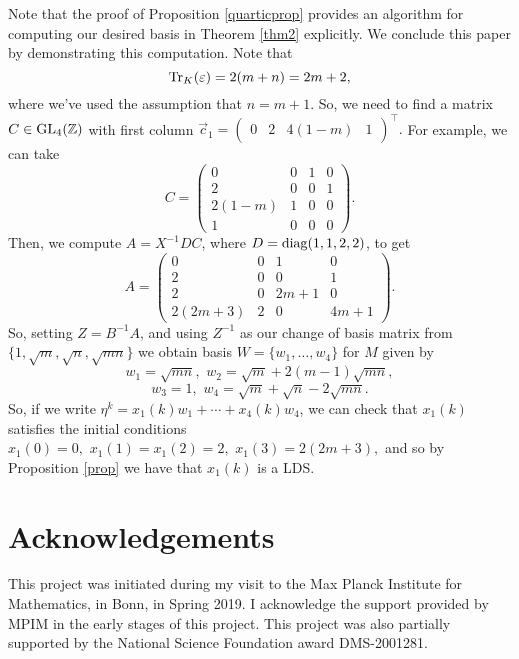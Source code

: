 \documentclass[11pt]{amsart}
\begin{document}
\begin{rmk} Note that the proof of Proposition \ref{quarticprop} provides an algorithm for computing our desired basis in Theorem \ref{thm2} explicitly. We conclude this paper by demonstrating this computation. Note that \[\operatorname{Tr}_K(\varepsilon)=2(m+n)=2m+2,\] where we've used the assumption that $n=m+1$. So, we need to find a matrix $C \in \operatorname{GL}_4(\mathbb{Z})$ with first column
$\vec{c}_1= \begin{pmatrix} 0 & 2 & 4(1-m) & 1 \end{pmatrix}^{\top}.$
For example, we can take
\[C=\begin{pmatrix} 0 & 0 & 1 & 0 \\ 2 & 0 & 0 & 1 \\ 2(1-m) & 1 & 0 & 0\\ 1 & 0 & 0 & 0 \end{pmatrix}. \]
Then, we compute $A=X^{-1} D C$, where $D=\operatorname{diag}(1, 1, 2, 2)$, to get
\[A=\begin{pmatrix} 0 & 0 & 1 & 0 \\ 2 & 0 & 0 & 1 \\ 2 & 0 & 2m+1 & 0 \\ 2(2m+3) & 2 & 0 & 4m+1 \end{pmatrix}.\]
So, setting $Z=B^{-1} A$, and using $Z^{-1}$ as our change of basis matrix from $\{1, \sqrt{m}, \sqrt{n}, \sqrt{mn}\}$ we obtain basis $W=\{w_1, \dots, w_4\}$ for $M$ given by
\[w_1=\sqrt{mn}, \,\, w_2=\sqrt{m}+2(m-1)\sqrt{mn},\]
\[w_3=1, \,\, w_4=\sqrt{m}+\sqrt{n}-2\sqrt{mn}.\]
So, if we write $\eta^k=x_1(k)w_1+\cdots+x_4(k)w_4$, we can check that $x_1(k)$ satisfies the initial conditions
$x_1(0)=0, \,\, x_1(1)=x_1(2)=2, \,\, x_1(3)=2(2m+3),$
and so by Proposition \ref{prop} we have that $x_1(k)$ is a LDS.
\end{rmk}





\section*{Acknowledgements}

This project was initiated during my visit to the Max Planck Institute for Mathematics, in Bonn, in Spring 2019. I acknowledge the support provided by MPIM in the early stages of this project. This project was also partially supported by the National Science Foundation award DMS-2001281. 






\end{document}

